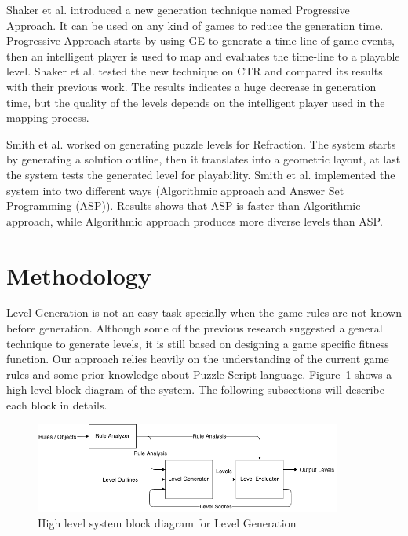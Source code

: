 \documentclass[letterpaper]{article}
\newcommand{\figref}[1]{Figure~\ref{Figure:#1}}
\begin{document}
Shaker et al.\cite{ctrProgressiveApproach} introduced a new generation technique named Progressive Approach. It can be used on any kind of games to reduce the generation time. Progressive Approach starts by using GE to generate a time-line of game events, then an intelligent player is used to map and evaluates the time-line to a playable level. Shaker et al. tested the new technique on CTR and compared its results with their previous work\cite{ctrSimulationApproach}. The results indicates a huge decrease in generation time, but the quality of the levels depends on the intelligent player used in the mapping process.\\\par

Smith et al.\cite{refractionStudy} worked on generating puzzle levels for Refraction\cite{refraction}. The system starts by generating a solution outline, then it translates into a geometric layout, at last the system tests the generated level for playability. Smith et al. implemented the system into two different ways (Algorithmic approach and Answer Set Programming (ASP)). Results shows that ASP is faster than Algorithmic approach, while Algorithmic approach produces more diverse levels than ASP.

\section{Methodology}
Level Generation is not an easy task specially when the game rules are not known before generation. Although some of the previous research suggested a general technique to generate levels, it is still based on designing a game specific fitness function. Our approach relies heavily on the understanding of the current game rules and some prior knowledge about Puzzle Script language. \figref{levelGenBlockDiagram} shows a high level block diagram of the system. The following subsections will describe each block in details.\\\par

\begin{figure}[ht]
  	\centering
    \includegraphics[width=0.9\textwidth]{Images/levelGenBlockDiagram}
    \caption{High level system block diagram for Level Generation}
    \label{Figure:levelGenBlockDiagram}
\end{figure}
\end{document}
